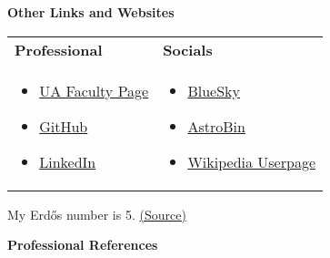 \documentclass[11pt]{article}
\begin{document}
\medskip

{\Large\textbf{Other Links and Websites}}

\medskip

\begin{tabular}{@{}p{} p{}@{}}
  \textbf{Professional} & \textbf{Socials} \\[0.0em]
  \begin{itemize}[leftmargin=*,nosep]
    \item \href{https://w3.physics.arizona.edu/person/andrew-steinmetz}{UA Faculty Page}
    \item \href{https://github.com/ajsteinmetz}{GitHub}
    \item \href{https://www.linkedin.com/in/ajsteinmetz/}{LinkedIn}
  \end{itemize}
&
  \begin{itemize}[leftmargin=*,nosep]
    \item \href{https://bsky.app/profile/ajsteinmetz.com}{BlueSky}
    \item \href{https://www.astrobin.com/users/djinn/}{AstroBin}
    \item \href{https://en.wikipedia.org/wiki/User:CosmologicalDefect}{Wikipedia Userpage}
  \end{itemize}
\end{tabular}

My Erd\H{o}s number is 5. \href{https://mathscinet.ams.org/mathscinet/freetools/collab-dist?source=1443426&target=189017}{(Source)}

\medskip


{\Large\textbf{Professional References}}
\end{document}
